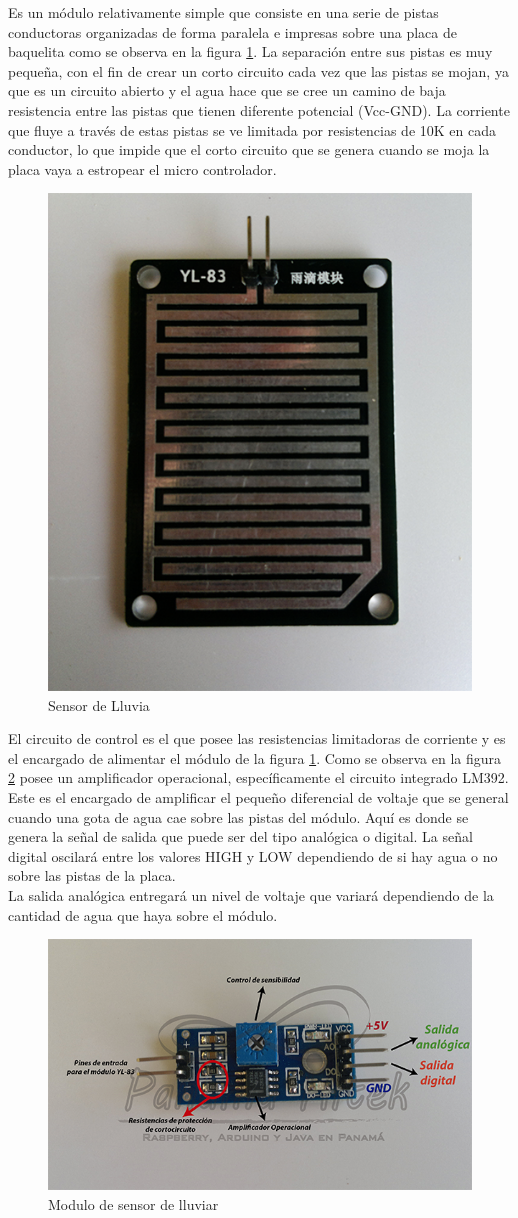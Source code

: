 Es un módulo relativamente simple que consiste en una serie de pistas conductoras organizadas de forma paralela e impresas sobre una placa de baquelita como se observa en la figura \ref{fig:yl-83}. La separación entre sus pistas 
es muy pequeña, con el fin de crear un corto circuito cada vez que las pistas se mojan, ya que es un circuito abierto y el agua hace que se cree un camino de baja resistencia entre las pistas que tienen diferente potencial (Vcc-GND). La corriente que fluye a través de estas pistas se ve limitada por resistencias de 10K en cada conductor, lo que impide que el corto circuito que se genera cuando se moja la placa vaya a estropear el micro controlador.\cite{LLU}\\

\begin{figure}
	\centering
	\caption{Sensor de Lluvia \cite{LLU}}
	\label{fig:yl-83}
	\includegraphics[width=0.35\linewidth]{Imagenes/YL-83}
\end{figure}

El circuito de control es el que posee las resistencias limitadoras de corriente y es el encargado de alimentar el módulo de la figura \ref{fig:yl-83}. Como se observa en la figura \ref{fig:yl-831} posee un amplificador operacional, específicamente el circuito integrado LM392. Este es el encargado de amplificar el pequeño diferencial de voltaje que se general cuando una gota de agua cae sobre las pistas del módulo. Aquí es donde se genera la señal de salida que puede ser del tipo analógica o digital. La señal digital oscilará entre los valores HIGH y LOW dependiendo de si hay agua o no sobre las pistas de la placa.\\

La salida analógica entregará un nivel de voltaje que variará dependiendo de la cantidad de agua que haya sobre el módulo.\cite{LLU}

\begin{figure}
	\centering
	\includegraphics[width=0.5\linewidth]{Imagenes/YL-831}
	\caption{Modulo de sensor de lluviar \cite{LLU}}
	\label{fig:yl-831}
\end{figure}

